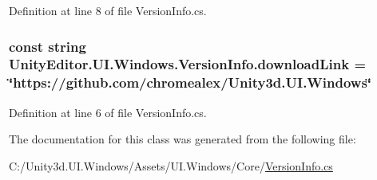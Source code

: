 Definition at line 8 of file Version\+Info.\+cs.

\hypertarget{class_unity_editor_1_1_u_i_1_1_windows_1_1_version_info_ad6a29d1089410776441d777edaa95b59}{}
\subsubsection[{download\+Link}]{\setlength{\rightskip}{0pt plus 5cm}const string Unity\+Editor.\+U\+I.\+Windows.\+Version\+Info.\+download\+Link = \char`\"{}https\+://github.\+com/chromealex/Unity3d.\+U\+I.\+Windows\char`\"{}}\label{class_unity_editor_1_1_u_i_1_1_windows_1_1_version_info_ad6a29d1089410776441d777edaa95b59}


Definition at line 6 of file Version\+Info.\+cs.



The documentation for this class was generated from the following file\+:\begin{DoxyCompactItemize}
\item 
C\+:/\+Unity3d.\+U\+I.\+Windows/\+Assets/\+U\+I.\+Windows/\+Core/\hyperlink{_version_info_8cs}{Version\+Info.\+cs}\end{DoxyCompactItemize}
